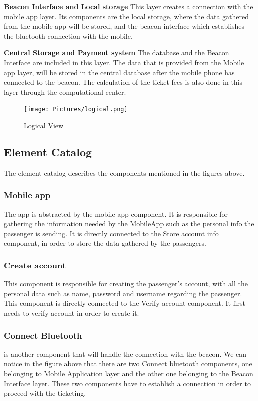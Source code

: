 \textbf{Beacon Interface and Local storage} This layer creates a connection with the mobile app layer. Its components are the local storage, where the data gathered from the mobile app will be stored, and the beacon interface which establishes the bluetooth connection with the mobile.

\textbf{Central Storage and Payment system} The database and the Beacon Interface are included in this layer. The data that is provided from the Mobile app layer, will be stored in the central database after the mobile phone has connected to the beacon. The calculation of the ticket fees is also done in this layer through the computational center.

\begin{figure}[H]
  \centering
  \texttt{[image: Pictures/logical.png]}
  \caption{Logical View}
  \label{fig:logical}
\end{figure}

\subsection{Element Catalog}
The element catalog describes the components mentioned in the figures above.

\subsubsection{Mobile app}
The app is abstracted by the mobile app component. It is responsible for gathering the information needed by the MobileApp such as the personal info the passenger is sending. It is directly connected to the Store account info component, in order to store the data gathered by the passengers.

\subsubsection{Create account}
This component is responsible for creating the passenger's account, with all the personal data such as name, password and username regarding the passenger. This component is directly connected to the Verify account component. It first needs to verify account in order to create it.

\subsubsection{Connect Bluetooth} is another component that will handle the connection with the beacon. We can notice in the figure above that there are two Connect bluetooth components, one belonging to Mobile Application layer and the other one belonging to the Beacon Interface layer. These two components have to establish a connection in order to proceed with the ticketing. 


